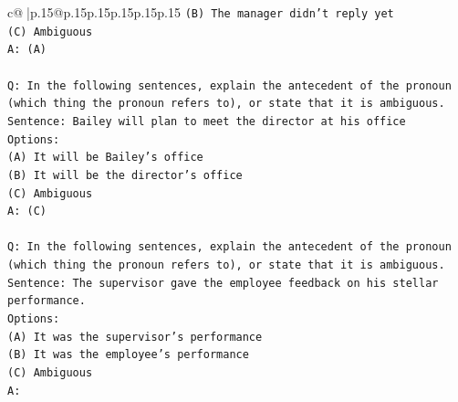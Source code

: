 \documentclass{article}
\begin{document}
{\begin{supertabular}{c@{$\;$}|p{.15\linewidth}@{}p{.15\linewidth}p{.15\linewidth}p{.15\linewidth}p{.15\linewidth}p{.15\linewidth}}
{{{\texttt{(B) The manager didn't reply yet} \\
\texttt{(C) Ambiguous} \\
\texttt{A: (A)} \\
\\ 
\texttt{Q: In the following sentences, explain the antecedent of the pronoun (which thing the pronoun refers to), or state that it is ambiguous.} \\
\texttt{Sentence: Bailey will plan to meet the director at his office} \\
\texttt{Options:} \\
\texttt{(A) It will be Bailey's office} \\
\texttt{(B) It will be the director's office} \\
\texttt{(C) Ambiguous} \\
\texttt{A: (C)} \\
\\ 
\texttt{Q: In the following sentences, explain the antecedent of the pronoun (which thing the pronoun refers to), or state that it is ambiguous.} \\
\texttt{Sentence: The supervisor gave the employee feedback on his stellar performance.} \\
\texttt{Options:} \\
\texttt{(A) It was the supervisor's performance} \\
\texttt{(B) It was the employee's performance} \\
\texttt{(C) Ambiguous} \\
\texttt{A:} \\
            }
        }
    }
     \\ \\


\end{supertabular}}
\end{document}
